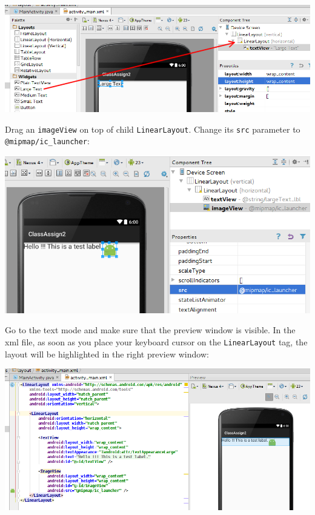 \begin{center}
	\includegraphics[scale=0.4]{chapters/ch03/images/23}
\end{center}

Drag an \texttt{imageView} on top of child \texttt{LinearLayout}. Change its \texttt{src} parameter to \texttt{@mipmap/ic\_launcher}:

\begin{center}
	\includegraphics[scale=0.4]{chapters/ch03/images/24}
\end{center}

Go to the text mode and make sure that the preview window is visible. In the xml file, as soon as you place your keyboard cursor on the \texttt{LinearLayout} tag, the layout will be highlighted in the right preview window:

\begin{center}
	\includegraphics[scale=0.4]{chapters/ch03/images/25}
\end{center}

